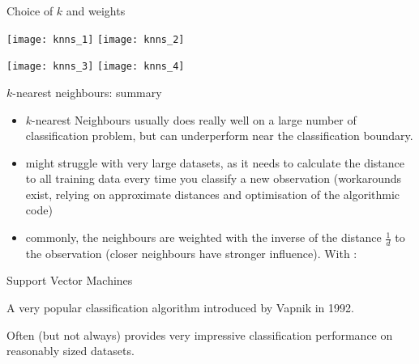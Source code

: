 \documentclass[compress,xcolor=table]{beamer}
\begin{document}
\begin{frame}{Choice of $k$ and weights}

\begin{center}
    \texttt{[image: knns\_1]}
    \texttt{[image: knns\_2]}

    \texttt{[image: knns\_3]}
    \texttt{[image: knns\_4]}
\end{center}
\end{frame}


    \begin{frame}{$k$-nearest neighbours: summary}

\begin{itemize}
    \item<+-> $k$-nearest Neighbours usually does really well on a large number of
    classification problem, but can underperform near the classification
    boundary.

    \item<+-> might struggle with very large datasets, as it needs to calculate the
    distance to all training data every time you classify a new observation
    (workarounds exist, relying on approximate distances and
    optimisation of the algorithmic code)

    \item<+-> commonly, the neighbours are weighted with the inverse of the
        distance $\frac{1}{d}$ to the observation (\ie closer neighbours have
        stronger influence). With :

\end{itemize}

\end{frame}

\begin{frame}{Support Vector Machines}

A very popular classification algorithm introduced by Vapnik in 1992.

\pause

Often (but not always) provides very impressive classification
performance on reasonably sized datasets.

\end{frame}
\end{document}
